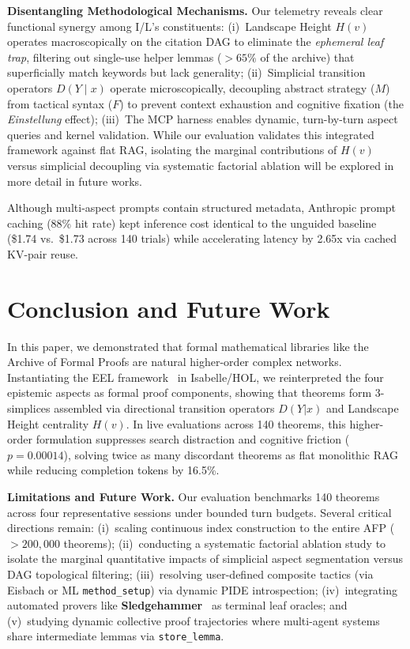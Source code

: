 \documentclass{svproc}
\begin{document}
\enlargethispage{2\baselineskip}
\medskip\noindent\textbf{Disentangling Methodological Mechanisms.} 
Our telemetry reveals clear functional synergy among I/L's constituents: 
(i)~Landscape Height $H(v)$ operates macroscopically on the citation DAG to eliminate the \emph{ephemeral leaf trap}, filtering out single-use helper lemmas ($>65\%$ of the archive) that superficially match keywords but lack generality; 
(ii)~Simplicial transition operators $D(Y \mid x)$ operate microscopically, decoupling abstract strategy ($M$) from tactical syntax ($F$) to prevent context exhaustion and cognitive fixation (the \emph{Einstellung} effect); 
(iii)~The MCP harness enables dynamic, turn-by-turn aspect queries and kernel validation. While our evaluation validates this integrated framework against flat RAG, isolating the marginal contributions of $H(v)$ versus simplicial decoupling via systematic factorial ablation will be explored in more detail in future works.

\medskip\noindent Although multi-aspect prompts contain structured metadata, Anthropic prompt caching (88\% hit rate) kept inference cost identical to the unguided baseline (\$1.74 vs.\ \$1.73 across 140 trials) while accelerating latency by 2.65x via cached KV-pair reuse.

\enlargethispage{2\baselineskip}
\section{Conclusion and Future Work}\label{sec:conclusion}

In this paper, we demonstrated that formal mathematical libraries like the Archive of Formal Proofs are natural higher-order complex networks. Instantiating the EEL framework~\cite{correia_embedding-based_2026,correia_eel_inprep} in Isabelle/HOL, we reinterpreted the four epistemic aspects as formal proof components, showing that theorems form 3-simplices assembled via directional transition operators $D(Y | x)$ and Landscape Height centrality $H(v)$. In live evaluations across 140 theorems, this higher-order formulation suppresses search distraction and cognitive friction ($p = 0.00014$), solving twice as many discordant theorems as flat monolithic RAG while reducing completion tokens by 16.5\%.

\medskip\noindent\textbf{Limitations and Future Work.} Our evaluation benchmarks 140 theorems across four representative sessions under bounded turn budgets. Several critical directions remain: (i)~scaling continuous index construction to the entire AFP ($>200,000$ theorems); (ii)~conducting a systematic factorial ablation study to isolate the marginal quantitative impacts of simplicial aspect segmentation versus DAG topological filtering; (iii)~resolving user-defined composite tactics (via Eisbach or ML \texttt{method\_setup}) via dynamic PIDE introspection; (iv)~integrating automated provers like \textbf{Sledgehammer}~\cite{blanchette_hammering_2016} as terminal leaf oracles; and (v)~studying dynamic collective proof trajectories where multi-agent systems share intermediate lemmas via \texttt{store\_lemma}.
\end{document}

